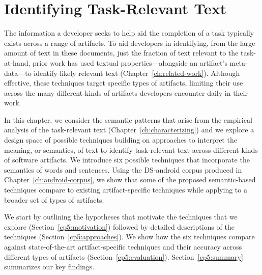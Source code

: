 \setcounter{chapter}{4}


\chapter{Identifying Task-Relevant Text}
\label{ch:identifying}

The information a developer seeks to help aid the completion of a task typically exists
across a range of artifacts. 
To aid developers in identifying, from the large amount of text
in these documents, just the fraction of text relevant
to the task-at-hand, prior work has used textual properties---alongside an artifact's meta-data---to
 identify likely relevant text (Chapter~\ref{ch:related-work}).
Although effective, these techniques target specific
types of artifacts, limiting their use across the 
many different kinds of artifacts developers encounter
daily in their work.



In this chapter, we consider the 
semantic patterns that arise from the empirical analysis of the task-relevant text (Chapter~\ref{ch:characterizing})
and we explore a design space of possible techniques building on approaches to interpret the meaning, or semantics, of text
to identify task-relevant text across different kinds of software artifacts.
We introduce six possible techniques that incorporate the  
semantics of words and sentences. 
Using the \acs{DS-android} corpus produced in Chapter~\ref{ch:android-corpus},
we show that some of the proposed semantic-based techniques 
compare to existing artifact-specific techniques 
while applying to a broader set of types of artifacts.





We start by outlining the hypotheses that motivate the techniques that we explore (Section~\ref{cp5:motivation}) followed by detailed descriptions of the
techniques (Section~\ref{cp5:approaches}).
We show how the six techniques 
compare against state-of-the-art artifact-specific techniques and 
their accuracy across different types of artifacts (Section~\ref{cp5:evaluation}). 
Section~\ref{cp5:summary} summarizes our key findings.











